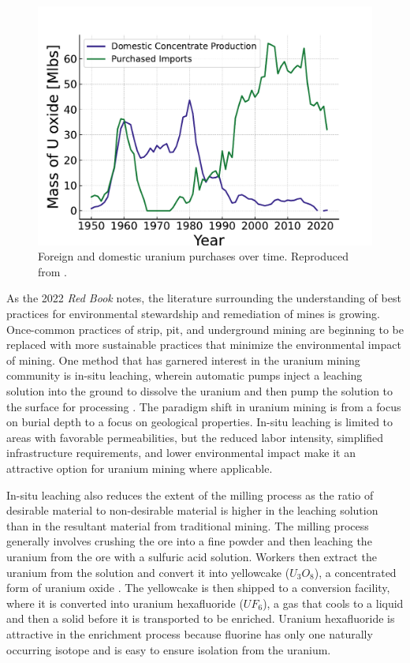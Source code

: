 \begin{figure}[H]
   \centering
   \includegraphics[scale=0.7]{images/intro/uranium_production_imports.pdf}
   \caption{Foreign and domestic uranium purchases over time. Reproduced from \cite{eia_monthly_energy_review_2024}.}
   \label{fig:foregin_u3o8}
\end{figure}

As the 2022 \textit{Red Book} notes, the literature surrounding the understanding of best practices for environmental stewardship and remediation of mines is growing. Once-common practices of strip, pit, and underground
mining are beginning to be replaced with more sustainable practices that
minimize the environmental impact of mining. One method that has garnered
interest in the uranium mining community is in-situ leaching, wherein automatic pumps inject a leaching solution into the ground to dissolve the uranium and then pump the solution to the surface for processing \cite{insitu_review_2024}. The paradigm shift in uranium mining is from a focus on burial depth to a focus on geological properties. In-situ leaching is limited to areas with favorable
permeabilities, but the reduced labor intensity, simplified infrastructure
requirements, and lower environmental impact make it an attractive option for
uranium mining where applicable.

In-situ leaching also reduces the extent of the milling process as the ratio of
desirable material to non-desirable material is higher in the leaching solution
than in the resultant material from traditional mining. The milling process
generally involves crushing the ore into a fine powder and then leaching the
uranium from the ore with a sulfuric acid solution. Workers then extract the
uranium from the solution and convert it into yellowcake ($U_3O_8$), a concentrated form
of uranium oxide \cite{milling_uranium_2022}. The yellowcake is then shipped to
a conversion facility, where it is converted into uranium hexafluoride ($UF_6$), a gas
that cools to a liquid and then a solid before it is transported to be
enriched. Uranium hexafluoride is attractive in the enrichment process because
fluorine has only one naturally occurring isotope and is easy to
ensure isolation from the uranium.

